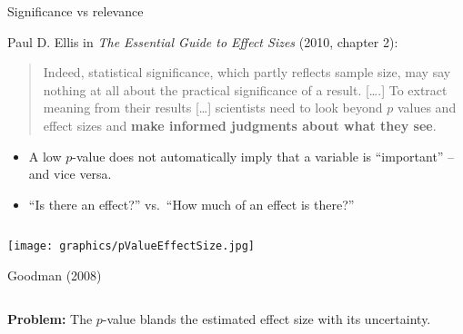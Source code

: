 \documentclass[
  10pt,
  ignorenonframetext,
]{beamer}
\providecommand{\tightlist}{%
  \setlength{\itemsep}{0pt}\setlength{\parskip}{0pt}}
\begin{document}
\begin{frame}
\begin{block}{Significance vs relevance}
\protect\hypertarget{significance-vs-relevance}{}
\(~\)

Paul D. Ellis in \emph{The Essential Guide to Effect Sizes} (2010,
chapter 2):

\vspace{6mm}

\begin{quote}
Indeed, statistical significance, which partly reflects sample size, may
say nothing at all about the practical significance of a result.
{[}\ldots.{]} To extract meaning from their results {[}\ldots{]}
scientists need to look beyond \(p\) values and effect sizes and
\textbf{make informed judgments about what they see}.
\end{quote}

\vspace{6mm}
\end{block}
\end{frame}

\begin{frame}
\vspace{2mm}

\begin{itemize}
\tightlist
\item
  A low \(p\)-value does not automatically imply that a variable is
  ``important'' -- and vice versa.
\end{itemize}

\vspace{2mm}

\begin{itemize}
\tightlist
\item
  ``Is there an effect?'' vs.~``How much of an effect is there?''
\end{itemize}

\(~\)

\flushleft

\centering

\texttt{[image: graphics/pValueEffectSize.jpg]}

\vspace{2mm}

\scriptsize

Goodman (2008)

\flushleft
\normalsize

\(~\)

\textbf{Problem:} The \(p\)-value blands the estimated effect size with
its uncertainty.
\end{frame}
\end{document}

